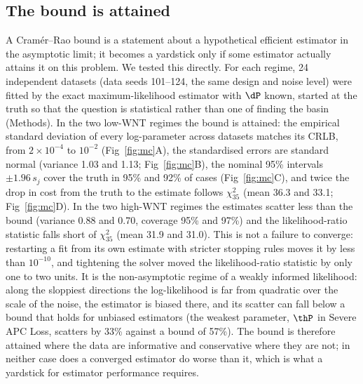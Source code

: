 \subsection{The bound is attained}
\label{sec:res-mc}

A Cram\'er--Rao bound is a statement about a hypothetical efficient estimator
in the asymptotic limit; it becomes a yardstick only if some estimator actually
attains it on this problem. We tested this directly. For each regime, 24
independent datasets (data seeds 101--124, the same design and noise level)
were fitted by the exact maximum-likelihood estimator with $\dP$ known, started
at the truth so that the question is statistical rather than one of finding the
basin (Methods). In the two low-WNT regimes the bound is attained: the
empirical standard deviation of every log-parameter across datasets matches
its CRLB, from $2\times10^{-4}$ to $10^{-2}$ (Fig~\ref{fig:mc}A), the standardised
errors are standard normal (variance 1.03 and 1.13; Fig~\ref{fig:mc}B), the
nominal 95\% intervals $\pm1.96\,s_j$ cover the truth in 95\% and 92\% of cases
(Fig~\ref{fig:mc}C), and twice the drop in cost from the truth to the estimate
follows $\chi^2_{35}$ (mean 36.3 and 33.1; Fig~\ref{fig:mc}D). In the two high-WNT
regimes the estimates scatter less than the bound (variance 0.88 and 0.70,
coverage 95\% and 97\%) and the likelihood-ratio statistic falls short of
$\chi^2_{35}$ (mean 31.9 and 31.0). This is not a failure to converge: restarting
a fit from its own estimate with stricter stopping rules moves it by less than
$10^{-10}$, and tightening the solver moved the likelihood-ratio statistic by
only one to two units. It is the non-asymptotic regime of a weakly informed
likelihood: along the sloppiest directions the log-likelihood is far from
quadratic over the scale of the noise, the estimator is biased there, and its
scatter can fall below a bound that holds for unbiased estimators (the weakest
parameter, $\thP$ in Severe APC Loss, scatters by 33\% against a bound of
57\%). The bound is therefore
attained where the data are informative and conservative where they are not;
in neither case does a converged estimator do worse than it, which is what a
yardstick for estimator performance requires.

